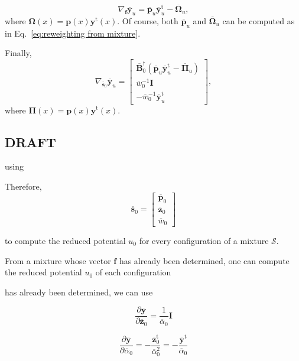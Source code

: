 \documentclass[aip,jcp,reprint,amsmath,amssymb]{revtex4-1}
\newcommand{\mt}[1]{\boldsymbol{\mathbf{#1}}}           %
\newcommand{\vt}[1]{\boldsymbol{\mathbf{#1}}}           %
\newcommand{\tr}[1]{#1^\text{t}}                        %
\begin{document}
\begin{equation*}
\nabla_{\vt f} {\overline{\vt y}_u} = \overline{\vt p}_u \tr{\overline{\vt y}}_u - \overline{\mt \Omega}_u,
\end{equation*}
where $\mt \Omega(x) = \vt p(x) \tr{\vt y}(x)$. Of course, both $\overline{\vt p}_u$ and $\overline{\mt \Omega}_u$ can be computed as in Eq.~\eqref{eq:reweighting from mixture}.


Finally,
\begin{equation*}
\nabla_{\overline{\vt s}_0} {\overline{\vt y}_u} = \left[\begin{array}{c}
\overline{\mt B}_0^\dag (\overline{\vt p}_u \tr{\overline{\vt y}}_u - \overline{\mt \Pi}_u) \\
\overline{w}_0^{-1} {\mt I} \\
-\overline{w}_0^{-1} \tr{\overline{\vt y}}_u
\end{array}\right],
\end{equation*}
where $\mt \Pi(x) = \vt p(x) \tr{\vt y}(x)$. 

\subsection{DRAFT}

using 

Therefore,
\begin{equation*}
\overline{\vt s}_0 = \left[\begin{array}{c}
\overline{\vt p}_0 \\
\overline{\vt z}_0 \\
\overline{w}_0
\end{array}\right]
\end{equation*}



 to compute the reduced potential $u_0$ for every configuration of a mixture $\mathcal S$.


From a mixture whose vector $\vt f$ has already been determined, one can compute the reduced potential $u_0$ of each configuration 

has already been determined, we can use 



\begin{equation*}
\frac{\partial \overline{\vt y}}{\partial \overline{\vt z}_0} = \frac{1}{\overline{\alpha}_0} \mt I
\end{equation*}

\begin{equation*}
\frac{\partial \overline{\vt y}}{\partial \overline{\alpha}_0} = -\frac{\tr{\overline{\vt z}}_0}{\overline{\alpha}_0^2} = -\frac{\tr{\overline{\vt y}}}{\overline{\alpha}_0}
\end{equation*}
\end{document}
